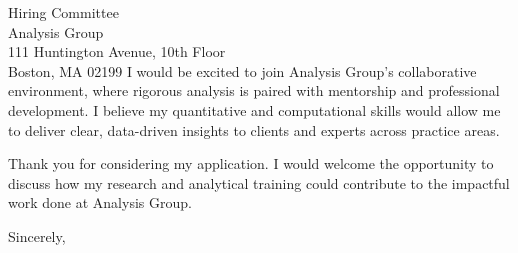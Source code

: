 \documentclass[11pt,letterpaper]{letter}
\begin{document}
\begin{letter}{Hiring Committee \\
Analysis Group \\
111 Huntington Avenue, 10th Floor \\
Boston, MA 02199}
I would be excited to join Analysis Group’s collaborative environment, where rigorous analysis is paired with mentorship and professional development. I believe my quantitative and computational skills would allow me to deliver clear, data-driven insights to clients and experts across practice areas.

Thank you for considering my application. I would welcome the opportunity to discuss how my research and analytical training could contribute to the impactful work done at Analysis Group.

\closing{Sincerely,}

\end{letter}
\end{document}
